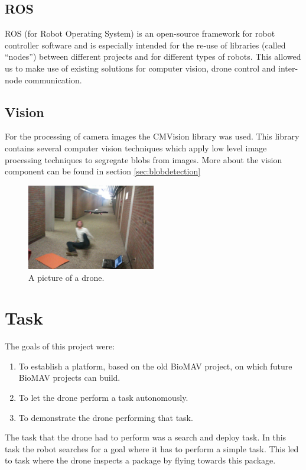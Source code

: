 \documentclass[a4paper,10pt]{article}
\begin{document}
\subsection{ROS}
ROS (for Robot Operating System) is an open-source framework for robot
controller software and is especially intended for the re-use of libraries
(called ``nodes'') between different projects and for different types of
robots. This allowed us to make use of existing solutions for computer vision, drone control and inter-node communication.

\subsection{Vision}
For the processing of camera images the CMVision library was used. 
This library contains several computer vision techniques which apply low level image processing techniques to segregate blobs from images. 
More about the vision component can be found in section \ref{sec:blobdetection}

\begin{figure}[h!]
	\caption{A picture of a drone.}
	\centering
	\includegraphics[width=0.5\textwidth]{images/droneAttack}
\end{figure}

\section{Task}
The goals of this project were:
\begin{enumerate}
\item To establish a platform, based on the old BioMAV project, on which
      future BioMAV projects can build.
\item To let the drone perform a task autonomously. 
\item To demonstrate the drone performing that task.
\end{enumerate}

The task that the drone had to perform was a search and deploy task. In this task the robot searches for a goal where it has to perform a simple task. This led to task where the drone inspects a package by flying towards this package.
\end{document}
